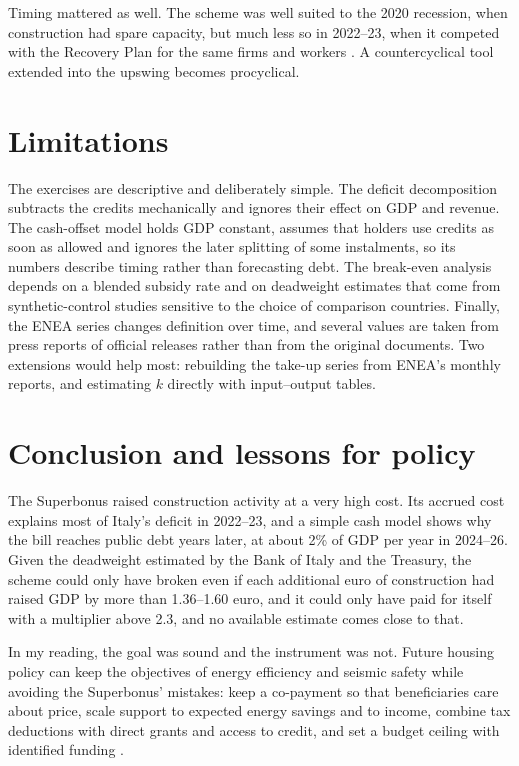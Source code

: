 \documentclass[11pt,a4paper]{article}
\begin{document}
Timing mattered as well. The scheme was well suited to the 2020 recession, when construction had spare capacity, but much less so in 2022--23, when it competed with the Recovery Plan for the same firms and workers \citep{codogno2024}. A countercyclical tool extended into the upswing becomes procyclical.

\section{Limitations}
The exercises are descriptive and deliberately simple. The deficit decomposition subtracts the credits mechanically and ignores their effect on GDP and revenue. The cash-offset model holds GDP constant, assumes that holders use credits as soon as allowed and ignores the later splitting of some instalments, so its numbers describe timing rather than forecasting debt. The break-even analysis depends on a blended subsidy rate and on deadweight estimates that come from synthetic-control studies sensitive to the choice of comparison countries. Finally, the ENEA series changes definition over time, and several values are taken from press reports of official releases rather than from the original documents. Two extensions would help most: rebuilding the take-up series from ENEA's monthly reports, and estimating $k$ directly with input--output tables.

\section{Conclusion and lessons for policy}
The Superbonus raised construction activity at a very high cost. Its accrued cost explains most of Italy's deficit in 2022--23, and a simple cash model shows why the bill reaches public debt years later, at about 2\% of GDP per year in 2024--26. Given the deadweight estimated by the Bank of Italy and the Treasury, the scheme could only have broken even if each additional euro of construction had raised GDP by more than 1.36--1.60 euro, and it could only have paid for itself with a multiplier above 2.3, and no available estimate comes close to that.

In my reading, the goal was sound and the instrument was not. Future housing policy can keep the objectives of energy efficiency and seismic safety while avoiding the Superbonus' mistakes: keep a co-payment so that beneficiaries care about price, scale support to expected energy savings and to income, combine tax deductions with direct grants and access to credit, and set a budget ceiling with identified funding \citep{deblasio2024}.
\end{document}
